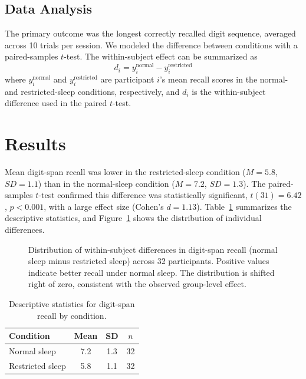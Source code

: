 \documentclass[11pt, a4paper]{article}
\begin{document}
\subsection{Data Analysis}
The primary outcome was the longest correctly recalled digit sequence,
averaged across 10 trials per session. We modeled the difference between
conditions with a paired-samples $t$-test. The within-subject effect can
be summarized as
\begin{equation}
    \label{eq:diff}
    d_i = y_i^{\text{normal}} - y_i^{\text{restricted}}
\end{equation}
where $y_i^{\text{normal}}$ and $y_i^{\text{restricted}}$ are participant
$i$'s mean recall scores in the normal- and restricted-sleep conditions,
respectively, and $d_i$ is the within-subject difference used in the
paired $t$-test.

\section{Results}
\label{sec:results}

Mean digit-span recall was lower in the restricted-sleep condition
($M = 5.8$, $SD = 1.1$) than in the normal-sleep condition ($M = 7.2$,
$SD = 1.3$). The paired-samples $t$-test confirmed this difference was
statistically significant, $t(31) = 6.42$, $p < 0.001$, with a large
effect size (Cohen's $d = 1.13$). Table~\ref{tab:results} summarizes the
descriptive statistics, and Figure~\ref{fig:recall} shows the
distribution of individual differences.

\begin{figure}[H]
    \centering
    \caption{Distribution of within-subject differences in digit-span
    recall (normal sleep minus restricted sleep) across 32 participants.
    Positive values indicate better recall under normal sleep. The
    distribution is shifted right of zero, consistent with the observed
    group-level effect.}
    \label{fig:recall}
\end{figure}

\begin{table}[H]
    \centering
    \caption{Descriptive statistics for digit-span recall by condition.}
    \label{tab:results}
    \begin{tabular}{lccc}
        \toprule
        Condition        & Mean & SD  & $n$ \\
        \midrule
        Normal sleep     & 7.2  & 1.3 & 32  \\
        Restricted sleep & 5.8  & 1.1 & 32  \\
        \bottomrule
    \end{tabular}
\end{table}
\end{document}
